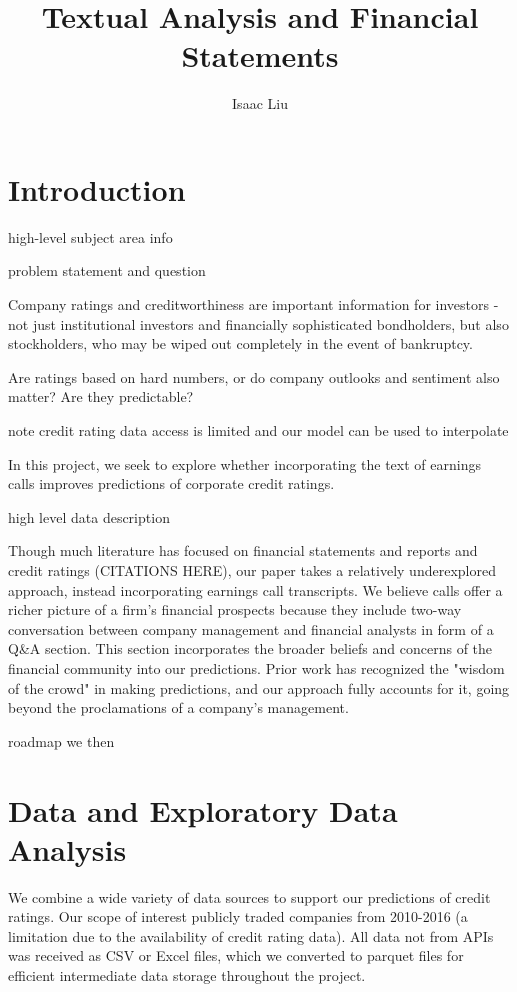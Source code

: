 \documentclass{article}
\title{Textual Analysis and Financial Statements}
\author{Isaac Liu}
\begin{document}
	\maketitle

    \section*{Introduction}

    high-level subject area info

    \citep{das_credit_2023}

    problem statement and question

    Company ratings and creditworthiness are important information for investors - not just institutional investors and financially sophisticated bondholders, but also stockholders, who may be wiped out completely in the event of bankruptcy.

    Are ratings based on hard numbers, or do company outlooks and sentiment also matter? Are they predictable?

    note credit rating data access is limited and our model can be used to interpolate

    In this project, we seek to explore whether incorporating the text of earnings calls improves predictions of corporate credit ratings.

    high level data description

    Though much literature has focused on financial statements and reports and credit ratings (CITATIONS HERE), our paper takes a relatively underexplored approach, instead incorporating earnings call transcripts. We believe calls offer a richer picture of a firm's financial prospects because they include two-way conversation between company management and financial analysts in form of a Q&A section. This section incorporates the broader beliefs and concerns of the financial community into our predictions. Prior work has recognized the "wisdom of the crowd" in making predictions, and our approach fully accounts for it, going beyond the proclamations of a company's management.

    roadmap
    we then

    \section*{Data and Exploratory Data Analysis}

    We combine a wide variety of data sources to support our predictions of credit ratings. Our scope of interest publicly traded companies from 2010-2016 (a limitation due to the availability of credit rating data). All data not from APIs was received as CSV or Excel files, which we converted to parquet files for efficient intermediate data storage throughout the project.
\end{document}
